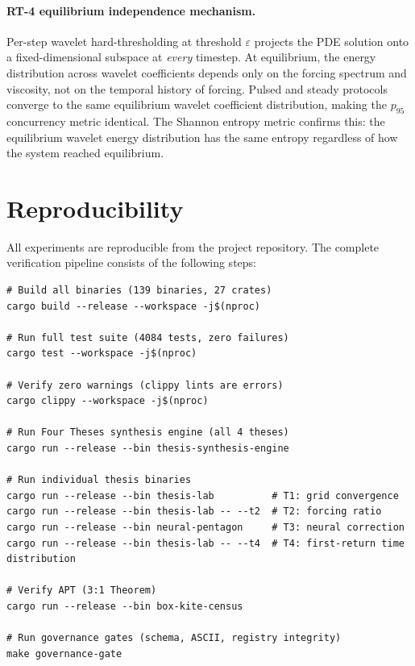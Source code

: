\documentclass[12pt]{article}
\theoremstyle{definition}
\theoremstyle{plain}
\theoremstyle{remark}
\begin{document}
\paragraph{RT-4 equilibrium independence mechanism.}
Per-step wavelet hard-thresholding at threshold $\varepsilon$ projects the
PDE solution onto a fixed-dimensional subspace at \emph{every} timestep.
At equilibrium, the energy distribution across wavelet coefficients depends
only on the forcing spectrum and viscosity, not on the temporal history of
forcing.  Pulsed and steady protocols converge to the same equilibrium
wavelet coefficient distribution, making the $p_{95}$ concurrency metric
identical.  The Shannon entropy metric confirms this: the equilibrium
wavelet energy distribution has the same entropy regardless of how the
system reached equilibrium.





\section{Reproducibility}
\label{sec:reproducibility}

All experiments are reproducible from the project repository.  The
complete verification pipeline consists of the following steps:

\begin{verbatim}
# Build all binaries (139 binaries, 27 crates)
cargo build --release --workspace -j$(nproc)

# Run full test suite (4084 tests, zero failures)
cargo test --workspace -j$(nproc)

# Verify zero warnings (clippy lints are errors)
cargo clippy --workspace -j$(nproc)

# Run Four Theses synthesis engine (all 4 theses)
cargo run --release --bin thesis-synthesis-engine

# Run individual thesis binaries
cargo run --release --bin thesis-lab          # T1: grid convergence
cargo run --release --bin thesis-lab -- --t2  # T2: forcing ratio
cargo run --release --bin neural-pentagon     # T3: neural correction
cargo run --release --bin thesis-lab -- --t4  # T4: first-return time distribution

# Verify APT (3:1 Theorem)
cargo run --release --bin box-kite-census

# Run governance gates (schema, ASCII, registry integrity)
make governance-gate
\end{verbatim}
\end{document}
